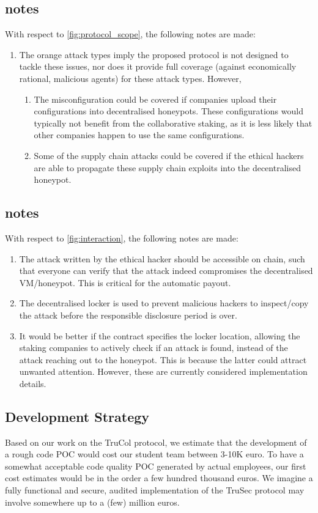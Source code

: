 \subsection{ notes}
With respect to \cref{fig:protocol_scope}, the following notes are made:
\begin{enumerate} 
    \item The orange attack types imply the proposed protocol is not designed to tackle these issues, nor does it provide full coverage (against economically rational, malicious agents) for these attack types. However,
    \begin{enumerate}
        \item The misconfiguration could be covered if companies upload their configurations into decentralised honeypots. These configurations would typically not benefit from the collaborative staking, as it is less likely that other companies happen to use the same configurations.
        \item Some of the supply chain attacks could be covered if the ethical hackers are able to propagate these supply chain exploits into the decentralised honeypot.
    \end{enumerate}
\end{enumerate}

\subsection{ notes}
With respect to \cref{fig:interaction}, the following notes are made:
\begin{enumerate} 
    \item The attack written by the ethical hacker should be accessible on chain, such that everyone can verify that the attack indeed compromises the decentralised VM/honeypot. This is critical for the automatic payout.
    \item The decentralised locker is used to prevent malicious hackers to inspect/copy the attack before the responsible disclosure period is over.
    \item It would be better if the contract specifies the locker location, allowing the staking companies to actively check if an attack is found, instead of the attack reaching out to the honeypot. This is because the latter could attract unwanted attention. However, these are currently considered implementation details.
\end{enumerate}


\subsection{Development Strategy}
Based on our work on the TruCol protocol, we estimate that the development of a rough code POC would cost our student team between 3-10K euro. To have a somewhat acceptable code quality POC generated by actual employees, our first cost estimates would be in the order a few hundred thousand euros. We imagine a fully functional and secure, audited implementation of the TruSec protocol may involve somewhere up to a (few) million euros. 


